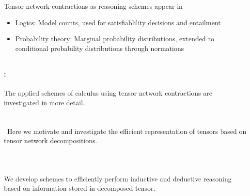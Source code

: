 Tensor network contractions as reasoning schemes appear in
\begin{itemize}
    \item Logics: Model counts, used for satisfiablility decisions and entailment
    \item Probability theory: Marginal probability distributions, extended to conditional probability distributions through normations
\end{itemize}

\ \\
\textbf{: \partthreetext}\\
\ \\
The applied schemes of calculus using tensor network contractions are investigated in more detail.
\ \\
\textbf{\focusonespec}\\
\\\
Here we motivate and investigate the efficient representation of tensors based on tensor network decompositions. \\
\ \\
\textbf{\focustwospec}\\
\ \\
We develop schemes to efficiently perform inductive and deductive reasoning based on information stored in decomposed tensor.


%
%
%
%
